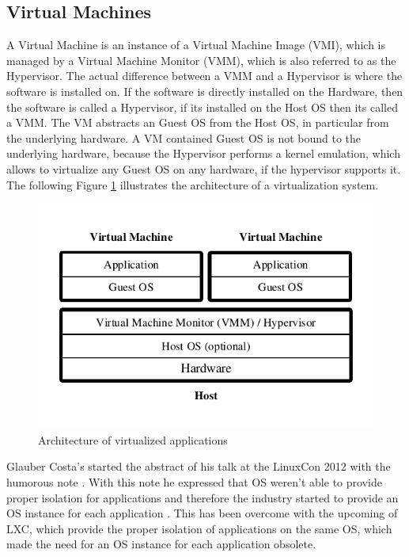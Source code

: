 \subsection{Virtual Machines}
\label{sec:docker-virtual-machines}
A Virtual Machine is an instance of a Virtual Machine Image (VMI), which is managed by a Virtual Machine Monitor (VMM), which is also referred to as the Hypervisor. The actual difference between a VMM and a Hypervisor is where the software is installed on. If the software is directly installed on the Hardware, then the software is called a Hypervisor, if its installed on the Host OS then its called a VMM. The VM abstracts  an Guest OS from the Host OS, in particular from the underlying hardware. A VM contained Guest OS is not bound to the underlying hardware, because the Hypervisor performs a kernel emulation, which allows to virtualize any Guest OS on any hardware, if the hypervisor supports it. The following Figure \ref{fig:docker-virtualization-architecture} illustrates the architecture of a virtualization system.

\begin{figure}[htbp]
	\centering
	\includegraphics[scale=0.8]{images/docker-virtualization-architecture.pdf}
	\caption{Architecture of virtualized applications}
	\label{fig:docker-virtualization-architecture}
\end{figure} 

Glauber Costa's started the abstract of his talk at the LinuxCon 2012 with the humorous note . With this note he expressed that OS weren't able to provide proper isolation for applications and therefore the industry started to provide an OS instance for each application \cite{LxConCosta2012}. This has been overcome with the upcoming of LXC, which provide the proper isolation of applications on the same OS, which made the need for an OS instance for each application obsolete.

